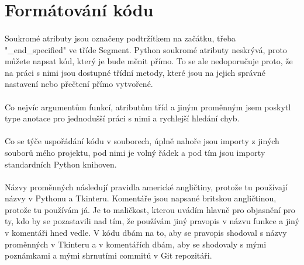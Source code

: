 \documentclass[12pt,a4paper]{report}
\begin{document}
\section{Formátování kódu}
\paragraph{} Soukromé atributy jsou označeny podtržítkem na začátku, třeba "\_end\_specified" ve tříde Segment. Python soukromé atributy neskrývá, proto můžete napsat kód, který je bude měnit přímo. To se ale nedoporučuje proto, že na práci s nimi jsou dostupné třídní metody, které jsou na jejich správné nastavení nebo přečtení přímo vytvořené.
\paragraph{} Co nejvíc argumentům funkcí, atributům tříd a jiným proměnným jsem poskytl type anotace pro jednodušší práci s nimi a rychlejší hledání chyb.
\paragraph{} Co se týče uspořádání kódu v souborech, úplně nahoře jsou importy z jiných souborů mého projektu, pod nimi je volný řádek a pod tím jsou importy standardních Python knihoven.
\paragraph{} Názvy proměnných následují pravidla americké angličtiny, protože tu používají názvy v Pythonu a Tkinteru. Komentáře jsou napsané britskou angličtinou, protože tu používám já. Je to maličkost, kterou uvádím hlavně pro objasnění pro ty, kdo by se pozastavili nad tím, že používám jiný pravopis v názvu funkce a jiný v komentáři hned vedle. V kódu dbám na to, aby se pravopis shodoval s názvy proměnných v Tkinteru a v komentářích dbám, aby se shodovaly s mými poznámkami a mými shrnutími commitů v Git repozitáři.
\end{document}
